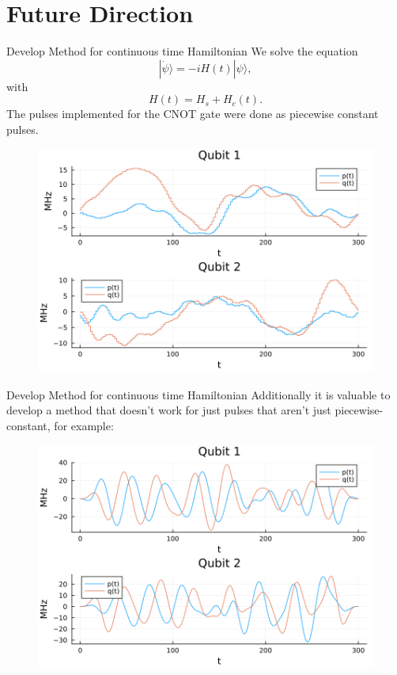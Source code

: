 \documentclass{beamer}
\begin{document}
\section{Future Direction}
\begin{frame}{Develop Method for continuous time Hamiltonian}
    We solve the equation \begin{equation*}
        |\dot{\psi}\rangle = -iH(t)|\psi\rangle,
    \end{equation*}
    with 
    \begin{equation*}
        H(t) = H_s + H_c(t).
    \end{equation*}
    \pause
    The pulses implemented for the CNOT gate were done as piecewise constant pulses.
    \begin{figure}
        \centering
        \includegraphics[width=0.65\linewidth]{images/Pulses/Pulses_plot.png}
        \caption*{}
        \label{fig:Pulses}
    \end{figure}
\end{frame}

\begin{frame}{Develop Method for continuous time Hamiltonian}
    Additionally it is valuable to develop a method that doesn't work for just pulses that aren't just piecewise-constant, for example: 
    \begin{figure}
        \centering
        \includegraphics[width=0.8\linewidth]{images/Pulses/B_Spline_pulses_plot.png}
        \label{fig:enter-label}
    \end{figure}
\end{frame}
\end{document}
